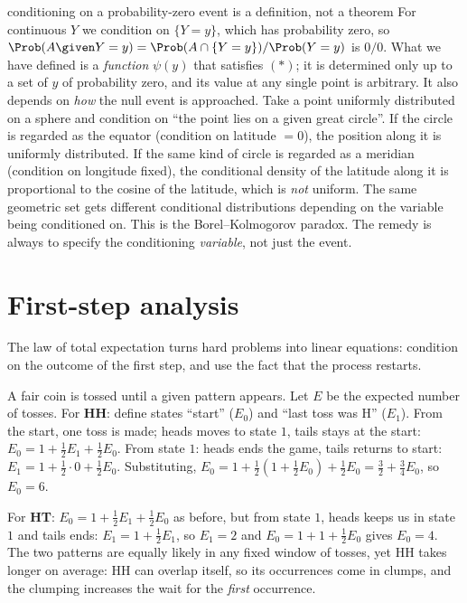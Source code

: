 \begin{nuance}{conditioning on a probability-zero event is a definition, not a theorem}
For continuous $Y$ we condition on $\{Y=y\}$, which has probability zero, so
$\Prob(A\given Y=y)=\Prob(A\cap\{Y=y\})/\Prob(Y=y)$ is $0/0$. What we have
defined is a \emph{function} $\psi(y)$ that satisfies $(\ast)$; it is determined only
up to a set of $y$ of probability zero, and its value at any single point is
arbitrary. It also depends on \emph{how} the null event is approached. Take a
point uniformly distributed on a sphere and condition on ``the point lies on a given
great circle''. If the circle is regarded as the equator (condition on latitude
$=0$), the position along it is uniformly distributed. If the same kind of circle is
regarded as a meridian (condition on longitude fixed), the conditional density of the
latitude along it is proportional to the cosine of the latitude, which is \emph{not}
uniform. The same geometric set gets different conditional distributions depending on
the variable being conditioned on. This is the Borel--Kolmogorov paradox. The remedy is always to specify
the conditioning \emph{variable}, not just the event.
\end{nuance}

\section{First-step analysis}

The law of total expectation turns hard problems into linear equations: condition
on the outcome of the first step, and use the fact that the process restarts.

\begin{example}\label{ex:hhht}
A fair coin is tossed until a given pattern appears. Let $E$ be the expected number
of tosses. For \textbf{HH}: define states ``start'' ($E_0$) and ``last toss was H''
($E_1$). From the start, one toss is made; heads moves to state $1$, tails stays at
the start: $E_0=1+\tfrac12E_1+\tfrac12E_0$. From state $1$: heads ends the game,
tails returns to start: $E_1=1+\tfrac12\cdot0+\tfrac12E_0$. Substituting,
$E_0=1+\tfrac12(1+\tfrac12E_0)+\tfrac12E_0=\tfrac32+\tfrac34E_0$, so $E_0=6$.

For \textbf{HT}: $E_0=1+\tfrac12E_1+\tfrac12E_0$ as before, but from state $1$,
heads keeps us in state $1$ and tails ends: $E_1=1+\tfrac12E_1$, so $E_1=2$ and
$E_0=1+1+\tfrac12E_0$ gives $E_0=4$. The two patterns are equally likely in any
fixed window of tosses, yet HH takes longer on average: HH can overlap itself, so
its occurrences come in clumps, and the clumping increases the wait for the
\emph{first} occurrence.
\end{example}

